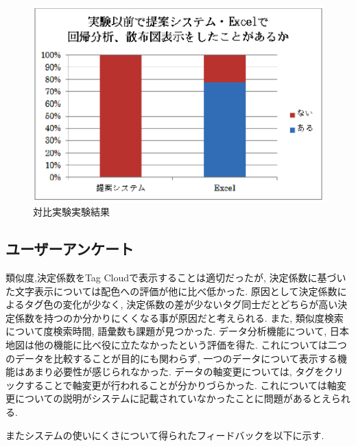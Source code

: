 \documentclass[sotsuron]{kuee}
\begin{document}
\begin{figure}
  \begin{center}
    \unitlength=1mm
   \includegraphics[width=120mm]{fig5-2.eps}
  \end{center}
  \caption{対比実験実験結果}
  \label{5.2-2}
\end{figure}

\subsection{ユーザーアンケート}

類似度,決定係数をTag Cloudで表示することは適切だったが, 決定係数に基づいた文字表示については配色への評価が他に比べ低かった.
原因として決定係数によるタグ色の変化が少なく, 決定係数の差が少ないタグ同士だとどちらが高い決定係数を持つのか分かりにくくなる事が原因だと考えられる.
また, 類似度検索について度検索時間, 語彙数も課題が見つかった. データ分析機能について, 日本地図は他の機能に比べ役に立たなかったという評価を得た.
これについては二つのデータを比較することが目的にも関わらず, 一つのデータについて表示する機能はあまり必要性が感じられなかった.
データの軸変更については, タグをクリックすることで軸変更が行われることが分かりづらかった.
これについては軸変更についての説明がシステムに記載されていなかったことに問題があるとえられる.

またシステムの使いにくさについて得られたフィードバックを以下に示す.
\end{document}
